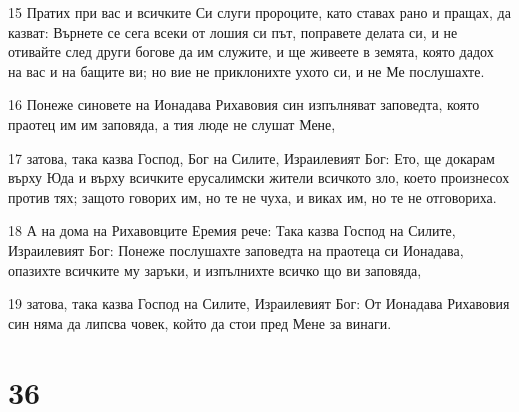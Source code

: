 \par 15 Пратих при вас и всичките Си слуги пророците, като ставах рано и пращах, да казват: Върнете се сега всеки от лошия си път, поправете делата си, и не отивайте след други богове да им служите, и ще живеете в земята, която дадох на вас и на бащите ви; но вие не приклонихте ухото си, и не Ме послушахте.
\par 16 Понеже синовете на Ионадава Рихавовия син изпълняват заповедта, която праотец им им заповяда, а тия люде не слушат Мене,
\par 17 затова, така казва Господ, Бог на Силите, Израилевият Бог: Ето, ще докарам върху Юда и върху всичките ерусалимски жители всичкото зло, което произнесох против тях; защото говорих им, но те не чуха, и виках им, но те не отговориха.
\par 18 А на дома на Рихавовците Еремия рече: Така казва Господ на Силите, Израилевият Бог: Понеже послушахте заповедта на праотеца си Ионадава, опазихте всичките му заръки, и изпълнихте всичко що ви заповяда,
\par 19 затова, така казва Господ на Силите, Израилевият Бог: От Ионадава Рихавовия син няма да липсва човек, който да стои пред Мене за винаги.

\chapter{36}


